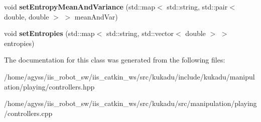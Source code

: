 \begin{DoxyCompactItemize}
\item 
void {\bfseries set\+Entropy\+Mean\+And\+Variance} (std\+::map$<$ std\+::string, std\+::pair$<$ double, double $>$ $>$ mean\+And\+Var)\hypertarget{classkukadu_1_1HapticControllerResult_a61989f77350b4021008f0c1a29e50423}{}\label{classkukadu_1_1HapticControllerResult_a61989f77350b4021008f0c1a29e50423}

\item 
void {\bfseries set\+Entropies} (std\+::map$<$ std\+::string, std\+::vector$<$ double $>$ $>$ entropies)\hypertarget{classkukadu_1_1HapticControllerResult_aa63c891414fe5d58deea87e4623d635f}{}\label{classkukadu_1_1HapticControllerResult_aa63c891414fe5d58deea87e4623d635f}

\end{DoxyCompactItemize}


The documentation for this class was generated from the following files\+:\begin{DoxyCompactItemize}
\item 
/home/agyss/iis\+\_\+robot\+\_\+sw/iis\+\_\+catkin\+\_\+ws/src/kukadu/include/kukadu/manipulation/playing/controllers.\+hpp\item 
/home/agyss/iis\+\_\+robot\+\_\+sw/iis\+\_\+catkin\+\_\+ws/src/kukadu/src/manipulation/playing/controllers.\+cpp\end{DoxyCompactItemize}
